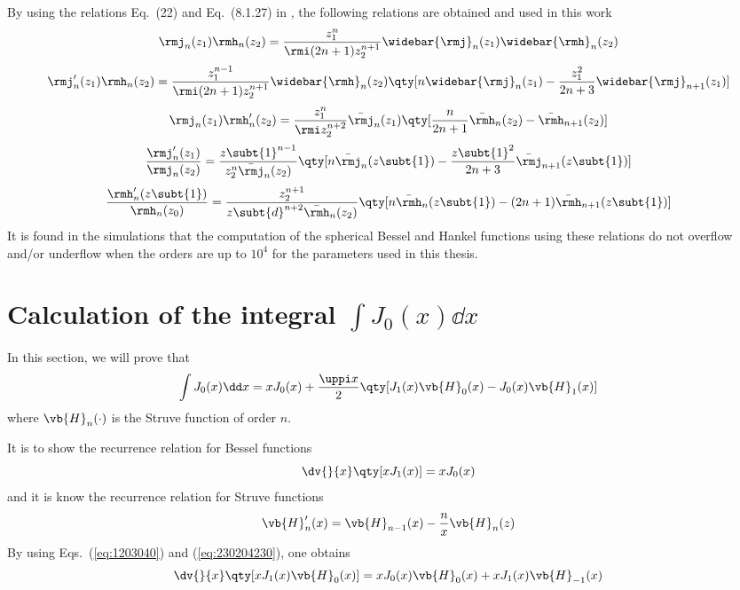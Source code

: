 By using the relations Eq.~(22) and Eq.~(8.1.27) in \cite{Zhang1996ComputationSpecialFunctions}, the following relations are obtained and used in this work
\begin{equation}
    \rmj_n(z_1)
    \rmh_n(z_2) = \frac{z_1^n}{\rmi(2n+1) z_2^{n+1}} \widebar{\rmj}_n(z_1)\widebar{\rmh}_n (z_2)
\end{equation}
\begin{equation}
    \rmj'_n(z_1)
    \rmh_n(z_2)
    = 
    \frac{z_1^{n-1}}{\rmi (2n+1)z_2^{n+1}}
    \widebar{\rmh}_n(z_2)
    \qty[n\widebar{\rmj}_n(z_1) - \frac{z_1^2}{2n+3} \widebar{\rmj}_{n+1}(z_1)]
\end{equation}
\begin{equation}
    \rmj_n(z_1)
    \rmh'_n(z_2) 
    = \frac{z_1^n}{\rmi z_2^{n+2}}\bar{\rmj}_n(z_1)
    \qty[\frac{n}{2n+1}\bar{\rmh}_n(z_2) - \bar{\rmh}_{n+1}(z_2)]
\end{equation}
\begin{equation}
    \frac{\rmj_n'(z_1)}{\rmj_n(z_2)}
    =\frac{z\subt{1}^{n-1}}{z_2^n\bar{\rmj}_n(z_2)}
    \qty[n\bar{\rmj}_n(z\subt{1}) - \frac{z\subt{1}^2}{2n+3} \bar{\rmj}_{n+1}(z\subt{1})]
\end{equation}
\begin{equation}
    \frac{\rmh'_n(z\subt{1})}{\rmh_n(z_0)}
    = 
    \frac{z_2^{n+1}}{z\subt{d}^{n+2}\bar{\rmh}_n(z_2)}
    \qty[n\bar{\rmh}_n(z\subt{1}) - (2n+1)\bar{\rmh}_{n+1}(z\subt{1})]
\end{equation}
It is found in the simulations that the computation of the spherical Bessel and Hankel functions using these relations do not overflow and/or underflow when the orders are up to $10^4$ for the parameters used in this thesis. 

\section{Calculation of the integral $\int J_0(x)\dd x$}
In this section, we will prove that 
\begin{equation}
    \int J_0(x)\dd x = 
    xJ_0(x) + \frac{\uppi x}{2 }\qty[J_1(x)\vb{H}_0(x) - J_0(x)\vb{H}_1(x)]
    \label{eq:123040210}
\end{equation}
where $\vb{H}_n(\cdot)$ is the Struve function of order $n$.

It is to show the recurrence relation for Bessel functions
\begin{equation}
    \dv{}{x}\qty[xJ_1(x)] = xJ_0(x)
    \label{eq:1203040}
\end{equation}
and it is know the recurrence relation for Struve functions 
\begin{equation}
    \vb{H}_n'(x) =  \vb{H}_{n-1}(x) - \frac{n}{x}\vb{H}_n(z)
    \label{eq:230204230}
\end{equation}
By using Eqs.~(\ref{eq:1203040}) and (\ref{eq:230204230}), one obtains
\begin{equation}
    \dv{}{x} \qty[xJ_1(x) \vb{H}_0(x)] = xJ_0(x) \vb{H}_0(x)  + xJ_1(x) \vb{H}_{-1}(x)
    \label{eq:230234023}
\end{equation}


